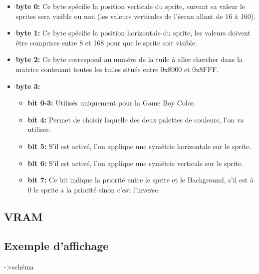 \documentclass{report}
\begin{document}
\begin{itemize}
\item \textbf{byte 0:}
	Ce byte spécifie la position verticale du sprite, suivant sa valeur le sprites sera visible ou non (les valeurs verticales de l'écran allant de 16 à 160).\\
\item \textbf{byte 1:}
	Ce byte spécifie la position horizontale du sprite, les valeurs doivent être comprises entre 8 et 168 pour que le sprite soit visible.\\
\item \textbf{byte 2:}
	Ce byte correspond au numéro de la tuile à aller chercher dans la matrice contenant toutes les tuiles située entre 0x8000 et 0x8FFF.\\
\item \textbf{byte 3:}
	\begin{itemize}
	\item \textbf{bit 0-3:}
		Utilisés uniquement pour la Game Boy Color.\\
	\item \textbf{bit 4:}
		Permet de choisir laquelle des deux palettes de couleurs, l'on va utiliser.\\
	\item \textbf{bit 5:}
		S'il est activé, l'on applique une symétrie horizontale sur le sprite.\\
	\item \textbf{bit 6:}
		S'il est activé, l'on applique une symétrie verticale sur le sprite.\\
	\item \textbf{bit 7:}
		Ce bit indique la priorité entre le sprite et le Background, s'il est à 0 le sprite a la priorité sinon c'est l'inverse.\\
	\end{itemize}
	
\end{itemize}

\subsection{VRAM}
	


\subsection{Exemple d'affichage}

->schéma
\end{document}
